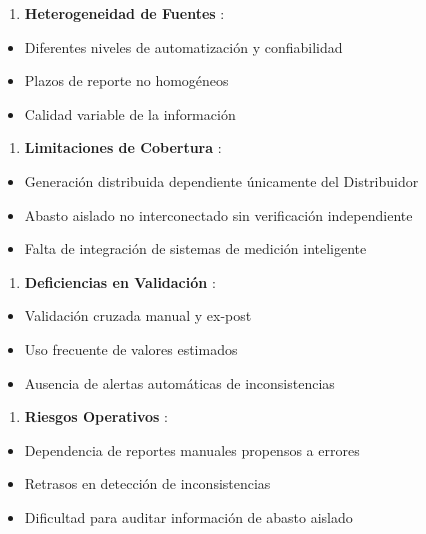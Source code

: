 \documentclass{cel}
\begin{document}
\begin{enumerate}
\item \textbf{Heterogeneidad de Fuentes} :

\end{enumerate}
\begin{itemize}
\item Diferentes niveles de automatización y confiabilidad
\item Plazos de reporte no homogéneos
\item Calidad variable de la información

\end{itemize}
\begin{enumerate}
\item \textbf{Limitaciones de Cobertura} :

\end{enumerate}
\begin{itemize}
\item Generación distribuida dependiente únicamente del Distribuidor
\item Abasto aislado no interconectado sin verificación independiente
\item Falta de integración de sistemas de medición inteligente

\end{itemize}
\begin{enumerate}
\item \textbf{Deficiencias en Validación} :

\end{enumerate}
\begin{itemize}
\item Validación cruzada manual y ex-post
\item Uso frecuente de valores estimados
\item Ausencia de alertas automáticas de inconsistencias

\end{itemize}
\begin{enumerate}
\item \textbf{Riesgos Operativos} :

\end{enumerate}
\begin{itemize}
\item Dependencia de reportes manuales propensos a errores
\item Retrasos en detección de inconsistencias
\item Dificultad para auditar información de abasto aislado

\end{itemize}
\end{document}

